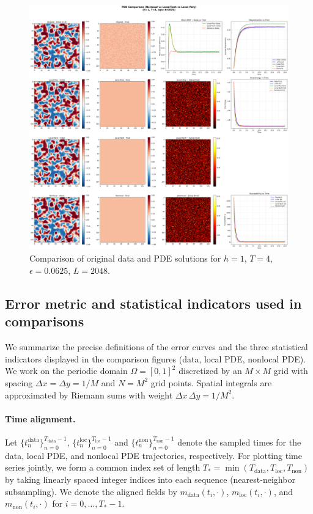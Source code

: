 \documentclass[11pt,a4paper]{article}
\begin{document}
\begin{figure}[!h]
    \centering
    \includegraphics[width=1.0\textwidth]{fig/compare_pde_solvers_L2048_h1_T4_eps0.0625.png}
    \caption{Comparison of original data and PDE solutions for $h=1$, $T=4$, $\epsilon=0.0625$, $L=2048$.}
    \label{fig:pde_comparison_h1_T4_eps0.0625_L2048}
\end{figure}


\subsection{Error metric and statistical indicators used in comparisons}
\label{sec:error_and_stats}

We summarize the precise definitions of the error curves and the three statistical indicators displayed in the comparison figures (data, local PDE, nonlocal PDE). We work on the periodic domain $\Omega=[0,1]^2$ discretized by an $M\times M$ grid with spacing $\Delta x = \Delta y = 1/M$ and $N=M^2$ grid points. Spatial integrals are approximated by Riemann sums with weight $\Delta x\,\Delta y = 1/M^2$.

\paragraph{Time alignment.} Let $\{t^{\text{data}}_n\}_{n=0}^{T_{\text{data}}-1}$, $\{t^{\text{loc}}_n\}_{n=0}^{T_{\text{loc}}-1}$ and $\{t^{\text{non}}_n\}_{n=0}^{T_{\text{non}}-1}$ denote the sampled times for the data, local PDE, and nonlocal PDE trajectories, respectively. For plotting time series jointly, we form a common index set of length $T_\ast=\min(T_{\text{data}},T_{\text{loc}},T_{\text{non}})$ by taking linearly spaced integer indices into each sequence (nearest-neighbor subsampling). We denote the aligned fields by $m_{\text{data}}(t_i,\cdot)$, $m_{\text{loc}}(t_i,\cdot)$, and $m_{\text{non}}(t_i,\cdot)$ for $i=0,\dots,T_\ast-1$.
\end{document}
